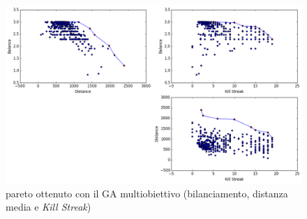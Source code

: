 \documentclass[12pt, italian]{toptesi}
\begin{document}
\begin{figure}[tp]
\centering
\includegraphics[width=1.0\textwidth]{pareto_dist_kill}
\caption{pareto ottenuto con il GA multiobiettivo (bilanciamento, distanza media e \emph{Kill Streak})}
\label{fig:pareto_dist_kill}
\end{figure}
\end{document}
